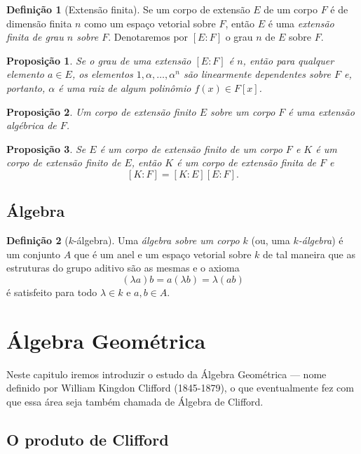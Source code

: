 \documentclass[a4paper,12pt]{report}
\theoremstyle{plain}
\newtheorem{proposicao}{Proposição}[section]
\theoremstyle{definition}
\newtheorem{definicao}{Definição}[section]
\begin{document}
\begin{definicao}[Extensão finita]
	Se um corpo de extensão $E$ de um corpo $F$ é de dimensão finita $n$ como um espaço vetorial sobre $F$, então $E$ é uma \emph{extensão finita de grau $n$ sobre $F$}. Denotaremos por $[E:F]$ o grau $n$ de $E$ sobre $F$.
\end{definicao}

\begin{proposicao}
	Se o grau de uma extensão $[E:F]$ é $n$, então para qualquer elemento $a\in E$, os elementos $1,\alpha,\dots,\alpha^n$ são linearmente dependentes sobre $F$ e, portanto, $\alpha$ é uma raiz de algum polinômio $f(x)\in F[x]$.
\end{proposicao}

\begin{proposicao}
	Um corpo de extensão finito $E$ sobre um corpo $F$ é uma extensão algébrica de $F$.
\end{proposicao}

\begin{proposicao}
	Se $E$ é um corpo de extensão finito de um corpo $F$ e $K$ é um corpo de extensão finito de $E$, então $K$ é um corpo de extensão finita de $F$ e $$[K:F] = [K:E][E:F].$$	
\end{proposicao}

\section{Álgebra}

\begin{definicao}[$k$-álgebra]
	Uma \emph{álgebra sobre um corpo $k$} (ou, uma \emph{$k$-álgebra}) é um conjunto $A$ que é um anel e um espaço vetorial sobre $k$ de tal maneira que as estruturas do grupo aditivo são as mesmas e o axioma $$(\lambda a)b = a(\lambda b) = \lambda(ab)$$ é satisfeito para todo $\lambda\in k$ e $a,b \in A$.
\end{definicao}

\chapter{Álgebra Geométrica}

Neste capitulo iremos introduzir o estudo da Álgebra Geométrica --- nome definido por William Kingdon Clifford (1845-1879), o que eventualmente fez com que essa área seja também chamada de Álgebra de Clifford.

\section{O produto de Clifford}
\end{document}
